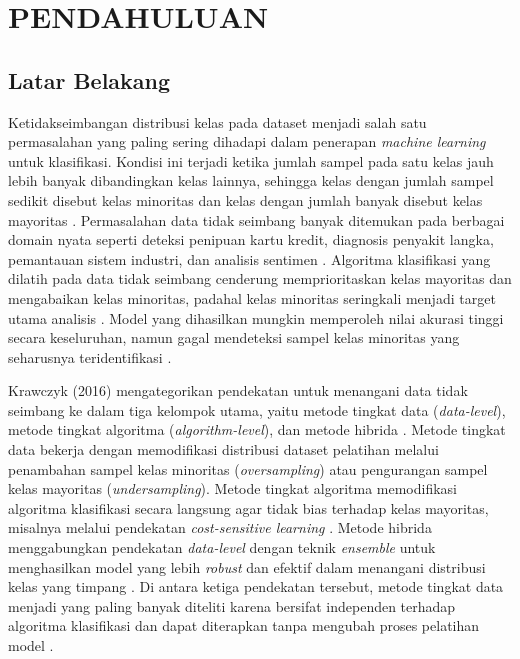 \newpage
\pagestyle{fancy}
\fancyhf{}
\fancyhead[R]{\thepage}
\chapter{PENDAHULUAN} \label{Bab I}

\section{Latar Belakang} \label{I.Latar Belakang}

Ketidakseimbangan distribusi kelas pada dataset menjadi salah satu permasalahan yang paling sering dihadapi dalam penerapan \textit{machine learning} untuk klasifikasi. Kondisi ini terjadi ketika jumlah sampel pada satu kelas jauh lebih banyak dibandingkan kelas lainnya, sehingga kelas dengan jumlah sampel sedikit disebut kelas minoritas dan kelas dengan jumlah banyak disebut kelas mayoritas \cite{He2009Imbalanced}. Permasalahan data tidak seimbang banyak ditemukan pada berbagai domain nyata seperti deteksi penipuan kartu kredit, diagnosis penyakit langka, pemantauan sistem industri, dan analisis sentimen \cite{Krawczyk2016Imbalanced}. Algoritma klasifikasi yang dilatih pada data tidak seimbang cenderung memprioritaskan kelas mayoritas dan mengabaikan kelas minoritas, padahal kelas minoritas seringkali menjadi target utama analisis \cite{Hou2025XGBoost}. Model yang dihasilkan mungkin memperoleh nilai akurasi tinggi secara keseluruhan, namun gagal mendeteksi sampel kelas minoritas yang seharusnya teridentifikasi \cite{VanFC2024Enhancing}.

Krawczyk (2016) mengategorikan pendekatan untuk menangani data tidak seimbang ke dalam tiga kelompok utama, yaitu metode tingkat data (\textit{data-level}), metode tingkat algoritma (\textit{algorithm-level}), dan metode hibrida \cite{Krawczyk2016Imbalanced}. Metode tingkat data bekerja dengan memodifikasi distribusi dataset pelatihan melalui penambahan sampel kelas minoritas (\textit{oversampling}) atau pengurangan sampel kelas mayoritas (\textit{undersampling}). Metode tingkat algoritma memodifikasi algoritma klasifikasi secara langsung agar tidak bias terhadap kelas mayoritas, misalnya melalui pendekatan \textit{cost-sensitive learning} \cite{Krawczyk2016Imbalanced}. Metode hibrida menggabungkan pendekatan \textit{data-level} dengan teknik \textit{ensemble} untuk menghasilkan model yang lebih \textit{robust} dan efektif dalam menangani distribusi kelas yang timpang \cite{Krawczyk2016Imbalanced}. Di antara ketiga pendekatan tersebut, metode tingkat data menjadi yang paling banyak diteliti karena bersifat independen terhadap algoritma klasifikasi dan dapat diterapkan tanpa mengubah proses pelatihan model \cite{He2009Imbalanced}.

